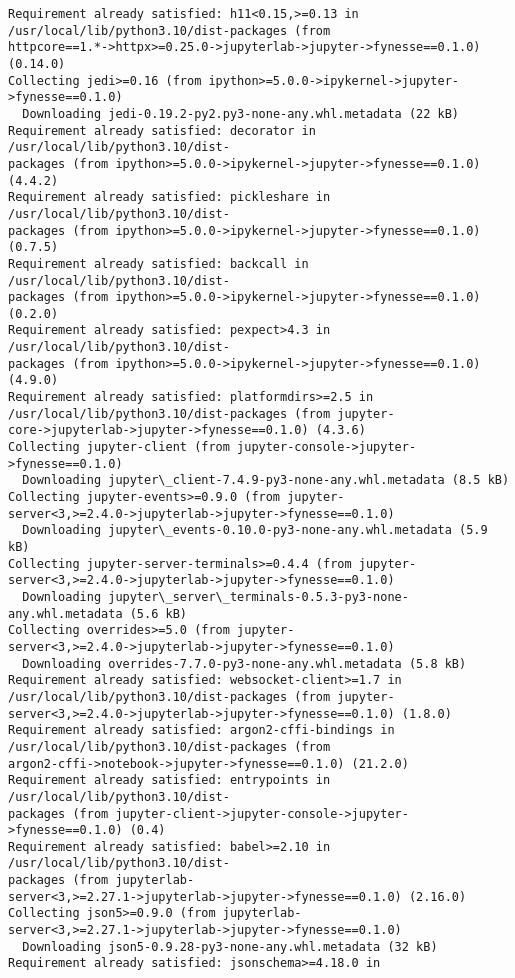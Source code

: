 \documentclass[11pt]{article}
\begin{document}
\begin{Verbatim}[commandchars=\\\{\}]
Requirement already satisfied: h11<0.15,>=0.13 in
/usr/local/lib/python3.10/dist-packages (from
httpcore==1.*->httpx>=0.25.0->jupyterlab->jupyter->fynesse==0.1.0) (0.14.0)
Collecting jedi>=0.16 (from ipython>=5.0.0->ipykernel->jupyter->fynesse==0.1.0)
  Downloading jedi-0.19.2-py2.py3-none-any.whl.metadata (22 kB)
Requirement already satisfied: decorator in /usr/local/lib/python3.10/dist-
packages (from ipython>=5.0.0->ipykernel->jupyter->fynesse==0.1.0) (4.4.2)
Requirement already satisfied: pickleshare in /usr/local/lib/python3.10/dist-
packages (from ipython>=5.0.0->ipykernel->jupyter->fynesse==0.1.0) (0.7.5)
Requirement already satisfied: backcall in /usr/local/lib/python3.10/dist-
packages (from ipython>=5.0.0->ipykernel->jupyter->fynesse==0.1.0) (0.2.0)
Requirement already satisfied: pexpect>4.3 in /usr/local/lib/python3.10/dist-
packages (from ipython>=5.0.0->ipykernel->jupyter->fynesse==0.1.0) (4.9.0)
Requirement already satisfied: platformdirs>=2.5 in
/usr/local/lib/python3.10/dist-packages (from jupyter-
core->jupyterlab->jupyter->fynesse==0.1.0) (4.3.6)
Collecting jupyter-client (from jupyter-console->jupyter->fynesse==0.1.0)
  Downloading jupyter\_client-7.4.9-py3-none-any.whl.metadata (8.5 kB)
Collecting jupyter-events>=0.9.0 (from jupyter-
server<3,>=2.4.0->jupyterlab->jupyter->fynesse==0.1.0)
  Downloading jupyter\_events-0.10.0-py3-none-any.whl.metadata (5.9 kB)
Collecting jupyter-server-terminals>=0.4.4 (from jupyter-
server<3,>=2.4.0->jupyterlab->jupyter->fynesse==0.1.0)
  Downloading jupyter\_server\_terminals-0.5.3-py3-none-any.whl.metadata (5.6 kB)
Collecting overrides>=5.0 (from jupyter-
server<3,>=2.4.0->jupyterlab->jupyter->fynesse==0.1.0)
  Downloading overrides-7.7.0-py3-none-any.whl.metadata (5.8 kB)
Requirement already satisfied: websocket-client>=1.7 in
/usr/local/lib/python3.10/dist-packages (from jupyter-
server<3,>=2.4.0->jupyterlab->jupyter->fynesse==0.1.0) (1.8.0)
Requirement already satisfied: argon2-cffi-bindings in
/usr/local/lib/python3.10/dist-packages (from
argon2-cffi->notebook->jupyter->fynesse==0.1.0) (21.2.0)
Requirement already satisfied: entrypoints in /usr/local/lib/python3.10/dist-
packages (from jupyter-client->jupyter-console->jupyter->fynesse==0.1.0) (0.4)
Requirement already satisfied: babel>=2.10 in /usr/local/lib/python3.10/dist-
packages (from jupyterlab-
server<3,>=2.27.1->jupyterlab->jupyter->fynesse==0.1.0) (2.16.0)
Collecting json5>=0.9.0 (from jupyterlab-
server<3,>=2.27.1->jupyterlab->jupyter->fynesse==0.1.0)
  Downloading json5-0.9.28-py3-none-any.whl.metadata (32 kB)
Requirement already satisfied: jsonschema>=4.18.0 in

\end{Verbatim}
\end{document}
